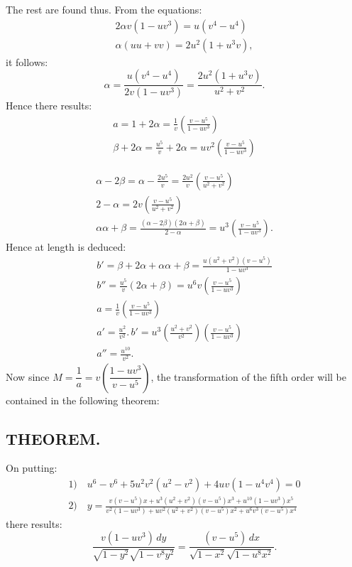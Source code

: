 \documentclass{article}
\begin{document}
The rest are found thus. From the equations:
\[
\begin{gathered}
2\alpha v(1-uv^{3})=u(v^{4}-u^{4})\\
\alpha(uu+vv)=2u^{2}(1+u^{3}v),
\end{gathered}
\]
it follows:
\[
\alpha=\frac{u(v^{4}-u^{4})}{2v(1-uv^{3})}=\frac{2u^{2}(1+u^{3}v)}{u^{2}+v^{2}}.
\]
Hence there results:
\[
\begin{gathered}
a=1+2\alpha=\frac{1}{v}\left(\frac{v-u^{5}}{1-uv^{3}}\right)\\
\beta+2\alpha=\frac{u^{5}}{v}+2\alpha=uv^{2}\left(\frac{v-u^{5}}{1-uv^{3}}\right)
\end{gathered}
\]

\[
\begin{gathered}
\alpha-2\beta=\alpha-\frac{2u^{5}}{v}=\frac{2u^{2}}{v}\left(\frac{v-u^{5}}{u^{2}+v^{2}}\right)\\
2-\alpha=2v\left(\frac{v-u^{5}}{u^{2}+v^{2}}\right)\\
\alpha\alpha+\beta=\frac{(\alpha-2\beta)(2\alpha+\beta)}{2-\alpha}=u^{3}\left(\frac{v-u^{5}}{1-uv^{3}}\right).
\end{gathered}
\]
Hence at length is deduced:
\[
\begin{gathered}
b'=\beta+2\alpha+\alpha\alpha+\beta=\frac{u(u^{2}+v^{2})(v-u^{5})}{1-uv^{3}}\\
b''=\frac{u^{5}}{v}(2\alpha+\beta)=u^{6}v\left(\frac{v-u^{5}}{1-uv^{3}}\right)\\
a=\frac{1}{v}\left(\frac{v-u^{5}}{1-uv^{3}}\right)\\
a'=\frac{u^{2}}{v^{2}}.\,b'=u^{3}\left(\frac{u^{2}+v^{2}}{v^{2}}\right)\left(\frac{v-u^{5}}{1-uv^{3}}\right)\\
a''=\frac{u^{10}}{v^{2}}.
\end{gathered}
\]
Now since $M=\dfrac{1}{a}=v\left(\dfrac{1-uv^{3}}{v-u^{5}}\right)$, the transformation of the fifth order will be contained in the following theorem:

\subsection*{THEOREM.}

On putting:
\[
\begin{gathered}
\text{1)}\quad u^{6}-v^{6}+5u^{2}v^{2}(u^{2}-v^{2})+4uv(1-u^{4}v^{4})=0\\
\text{2)}\quad y=\frac{v(v-u^{5})x+u^{3}(u^{2}+v^{2})(v-u^{5})x^{3}+u^{10}(1-uv^{3})x^{5}}{v^{2}(1-uv^{3})+uv^{2}(u^{2}+v^{2})(v-u^{5})x^{2}+u^{6}v^{3}(v-u^{5})x^{4}}
\end{gathered}
\]
there results:
\[
\frac{v(1-uv^{3})\,dy}{\sqrt{1-y^{2}}\sqrt{1-v^{8}y^{2}}}=\frac{(v-u^{5})\,dx}{\sqrt{1-x^{2}}\sqrt{1-u^{8}x^{2}}}.
\]
\end{document}
